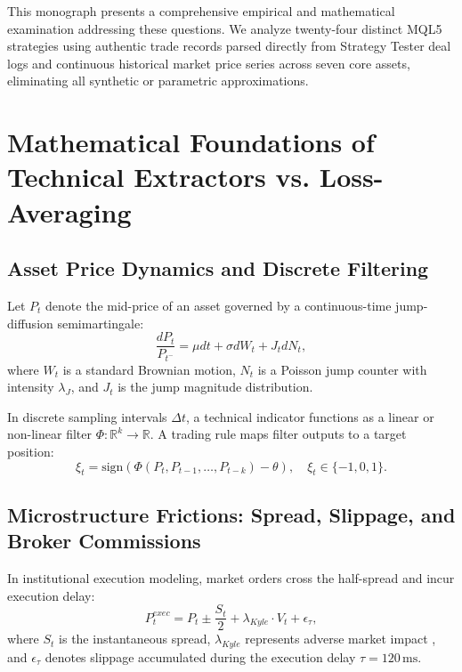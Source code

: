 \documentclass[11pt,a4paper]{article}
\begin{document}
This monograph presents a comprehensive empirical and mathematical examination addressing these questions. We analyze twenty-four distinct MQL5 strategies using authentic trade records parsed directly from Strategy Tester deal logs and continuous historical market price series across seven core assets, eliminating all synthetic or parametric approximations.

\section{Mathematical Foundations of Technical Extractors vs. Loss-Averaging}

\subsection{Asset Price Dynamics and Discrete Filtering}
Let $P_t$ denote the mid-price of an asset governed by a continuous-time jump-diffusion semimartingale:
\begin{equation}
\frac{dP_t}{P_{t^-}} = \mu dt + \sigma dW_t + J_t dN_t,
\end{equation}
where $W_t$ is a standard Brownian motion, $N_t$ is a Poisson jump counter with intensity $\lambda_J$, and $J_t$ is the jump magnitude distribution. 

In discrete sampling intervals $\Delta t$, a technical indicator functions as a linear or non-linear filter $\Phi: \mathbb{R}^k \to \mathbb{R}$. A trading rule maps filter outputs to a target position:
\begin{equation}
\xi_t = \text{sign}(\Phi(P_{t}, P_{t-1}, \dots, P_{t-k}) - \theta), \quad \xi_t \in \{-1, 0, 1\}.
\end{equation}

\subsection{Microstructure Frictions: Spread, Slippage, and Broker Commissions}
In institutional execution modeling, market orders cross the half-spread and incur execution delay:
\begin{equation}
P_t^{exec} = P_t \pm \frac{S_t}{2} + \lambda_{Kyle} \cdot V_t + \epsilon_{\tau},
\end{equation}
where $S_t$ is the instantaneous spread, $\lambda_{Kyle}$ represents adverse market impact \cite{kyle1985continuous}, and $\epsilon_{\tau}$ denotes slippage accumulated during the execution delay $\tau = 120\,\text{ms}$. 
\end{document}
